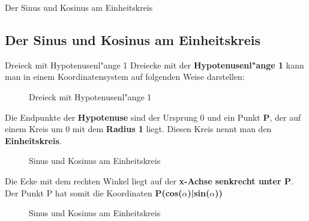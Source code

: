 \documentclass{standalone}
\begin{document}
\begin{frame}
  \begin{center}
    Der Sinus und Kosinus am Einheitskreis
  \end{center}
  \subsection{Der Sinus und Kosinus am Einheitskreis}
\end{frame}

\begin{frame}{Dreieck mit Hypotenusenl{"a}nge 1}
	Dreiecke mit der \textbf{Hypotenusenl{"a}nge 1} kann man in einem Koordinatensystem auf folgenden Weise darstellen:
	\begin{figure}[hb!]
		\centering
		\def\svgwidth{200px}
		
		\caption{Dreieck mit Hypotenusenl{"a}nge 1}
		\label{fig:rechtwinkliges_dreieck_hypotenuse_eins}
	\end{figure}
\end{frame}


\begin{frame}{1}
	Die Endpunkte der \textbf{Hypotenuse} sind der Ursprung 0 und ein Punkt \textbf{P}, der auf einem Kreis um 0 mit dem \textbf{Radius 1} liegt. Diesen Kreis nennt man den \textbf{Einheitskreis}.

	\begin{figure}[hb!]
		\centering
		\def\svgwidth{150px}
		
		\caption{Sinus und Kosinus am Einheitskreis}
		\label{fig:sin_cos_einheitskreis_1}
	\end{figure}
\end{frame}

\begin{frame}{2}
	Die Ecke mit dem rechten Winkel liegt auf der \textbf{x-Achse senkrecht unter P}. Der Punkt P hat somit die Koordinaten \textbf{P(cos($\alpha$)|sin($\alpha$))}

	\begin{figure}[hb!]
		\centering
		\def\svgwidth{150px}
		
		\caption{Sinus und Kosinus am Einheitskreis}
		\label{fig:sin_cos_einheitskreis_2}
	\end{figure}
\end{frame}
\end{document}
